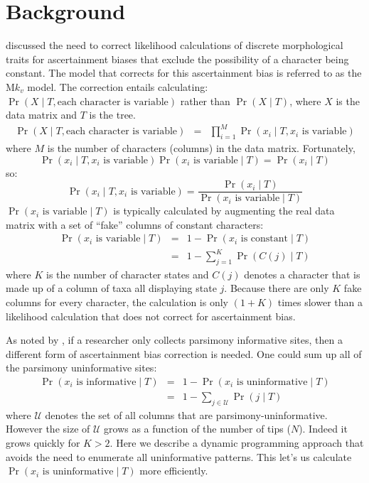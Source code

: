 \documentclass[11pt]{article}
\begin{document}
\tableofcontents
\section{Background}
\citet{Lewis2001} discussed the need to correct likelihood calculations of discrete morphological traits for ascertainment biases that exclude the possibility of a character being constant.
The model that corrects for this ascertainment bias is referred to as the M$k_v$ model.
The correction entails calculating:
$ \Pr(X \mid T, \mbox{each character is variable})$ rather than
$\Pr(X \mid T)$, where $X$ is the data matrix and $T$ is the tree.
\begin{eqnarray*}
\Pr(X \mid T, \mbox{each character is variable}) & = & \prod_{i=1}^M\Pr(x_i \mid T, x_i\mbox{ is variable})
\end{eqnarray*}
where $M$ is the number of characters (columns) in the data matrix.
Fortunately,
$$\Pr(x_i \mid T, x_i\mbox{ is variable})\Pr(x_i\mbox{ is variable}\mid T) = \Pr(x_i\mid T)$$
so:
$$\Pr(x_i \mid T, x_i\mbox{ is variable}) = \frac{\Pr(x_i\mid T)}{\Pr(x_i\mbox{ is variable}\mid T)}$$
$\Pr(x_i\mbox{ is variable}\mid T)$ is typically calculated by augmenting the real data matrix with a set of ``fake'' columns of constant characters:
\begin{eqnarray*}
\Pr(x_i\mbox{ is variable}\mid T) & = & 1 -\Pr(x_i\mbox{ is constant}\mid T) \\
& = & 1 - \sum_{j=1}^K\Pr(C(j)\mid T)
\end{eqnarray*}
where $K$ is the number of character states and $C(j)$ denotes a 
character that is made up of a column of taxa all displaying state $j$.
Because there are only $K$ fake columns for every character, the calculation is only $(1+K)$ times slower than a likelihood calculation that does not correct for ascertainment bias.


As noted by \citet{MatzkeI2018}, if a researcher only collects parsimony informative sites, then a different form of ascertainment bias correction is needed.
One could sum up all of the parsimony uninformative sites:
\begin{eqnarray*}
\Pr(x_i\mbox{ is informative}\mid T) & = & 1 -\Pr(x_i\mbox{ is uninformative}\mid T) \\
& = & 1 - \sum_{j\in \mathcal{U}} \Pr(j\mid T)
\end{eqnarray*}
where $\mathcal{U}$ denotes the set of all columns that are parsimony-uninformative.
However the size of $\mathcal{U}$ grows as a function of the number of tips ($N$).
Indeed it grows quickly for $K>2$.
Here we describe a dynamic programming approach that avoids the need to
	enumerate all uninformative patterns.
This let's us calculate
$\Pr(x_i\mbox{ is uninformative}\mid T)$
more efficiently.
\end{document}
